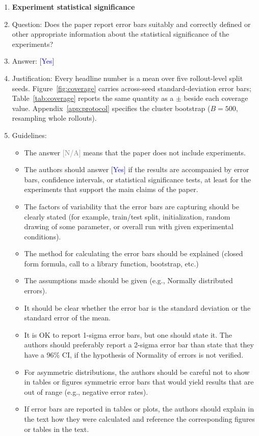 \documentclass{article}
\providecommand{\answerYes}[1][]{\textcolor{blue}{[Yes] #1}}
\providecommand{\answerNA}[1][]{\textcolor{gray}{[N/A] #1}}
\begin{document}
\begin{enumerate}
\item {\bf Experiment statistical significance}
    \item[] Question: Does the paper report error bars suitably and correctly defined or other appropriate information about the statistical significance of the experiments?
    \item[] Answer: \answerYes{}
    \item[] Justification: Every headline number is a mean over five rollout-level split seeds. Figure~\ref{fig:coverage} carries across-seed standard-deviation error bars; Table~\ref{tab:coverage} reports the same quantity as a $\pm$ beside each coverage value. Appendix~\ref{app:protocol} specifies the cluster bootstrap ($B = 500$, resampling whole rollouts).
    \item[] Guidelines:
    \begin{itemize}
        \item The answer \answerNA{} means that the paper does not include experiments.
        \item The authors should answer \answerYes{} if the results are accompanied by error bars, confidence intervals, or statistical significance tests, at least for the experiments that support the main claims of the paper.
        \item The factors of variability that the error bars are capturing should be clearly stated (for example, train/test split, initialization, random drawing of some parameter, or overall run with given experimental conditions).
        \item The method for calculating the error bars should be explained (closed form formula, call to a library function, bootstrap, etc.)
        \item The assumptions made should be given (e.g., Normally distributed errors).
        \item It should be clear whether the error bar is the standard deviation or the standard error of the mean.
        \item It is OK to report 1-sigma error bars, but one should state it. The authors should preferably report a 2-sigma error bar than state that they have a 96\% CI, if the hypothesis of Normality of errors is not verified.
        \item For asymmetric distributions, the authors should be careful not to show in tables or figures symmetric error bars that would yield results that are out of range (e.g., negative error rates).
        \item If error bars are reported in tables or plots, the authors should explain in the text how they were calculated and reference the corresponding figures or tables in the text.
    \end{itemize}


\end{enumerate}
\end{document}
